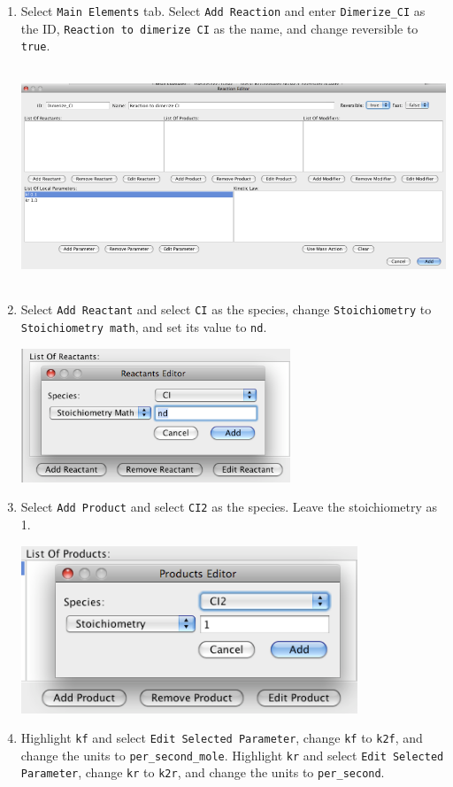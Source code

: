 \documentclass[titlepage,11pt]{article}
\begin{document}
\begin{enumerate}
\item Select {\tt Main Elements} tab.  Select {\tt Add Reaction} and
  enter {\tt Dimerize\_CI} as the ID, {\tt Reaction to dimerize CI} as
  the name, and change reversible to {\tt true}.

\includegraphics[height=65mm]{screenshots/reaction}

\item Select {\tt Add Reactant} and select {\tt CI} as the species,
      change {\tt Stoichiometry} to {\tt Stoichiometry math}, and set its
      value to {\tt nd}.

\includegraphics[height=40mm]{screenshots/reactant}

\item Select {\tt Add Product} and select {\tt CI2} as the species.
      Leave the stoichiometry as 1.

\includegraphics[height=50mm]{screenshots/product}

\item Highlight {\tt kf} and select {\tt Edit Selected Parameter}, change
      {\tt kf} to {\tt k2f}, and change the units to {\tt per\_second\_mole}.
      Highlight {\tt kr} and select {\tt Edit Selected Parameter}, change
      {\tt kr} to {\tt k2r}, and change the units to {\tt per\_second}.


\end{enumerate}
\end{document}
